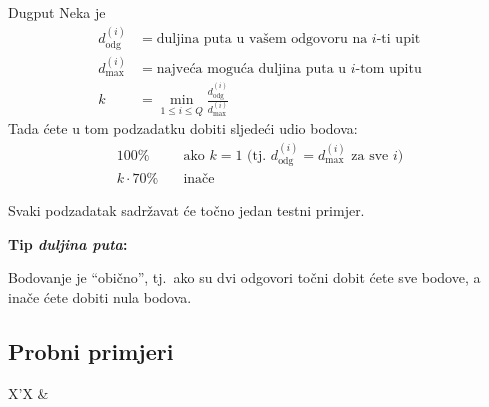 \begin{statement}[
  problempoints=100,
  timelimit=1 sekunda,
  memorylimit=512 MiB,
]{Dugput}
Neka je
\begin{align*}
    d_\mathrm{odg}^{(i)} &= \text{duljina puta u vašem odgovoru na $i$-ti upit} \\ 
    d_\mathrm{max}^{(i)} &= \text{najveća moguća duljina puta u $i$-tom upitu} \\
    k &= \min_{1 \leq i \leq Q} \frac{d_\mathrm{odg}^{(i)}}{d_\mathrm{max}^{(i)}}
\end{align*}
Tada ćete u tom podzadatku dobiti sljedeći udio bodova:
\begin{align*}
    100\% &\quad \text{ako $k = 1$ (tj.\ $d_\mathrm{odg}^{(i)} = d_\mathrm{max}^{(i)}$ za sve $i$)} \\
    k \cdot 70\% &\quad \text{inače}
\end{align*}

Svaki podzadatak sadržavat će točno jedan testni primjer.

\textbf{Tip \textit{duljina puta}:}

Bodovanje je ``obično'', tj.\ ako su dvi odgovori točni dobit ćete sve bodove,
a inače ćete dobiti nula bodova.

\subsection*{Probni primjeri}
\begin{tabularx}{\textwidth}{X'X}
 &
\end{tabularx}


\end{statement}

